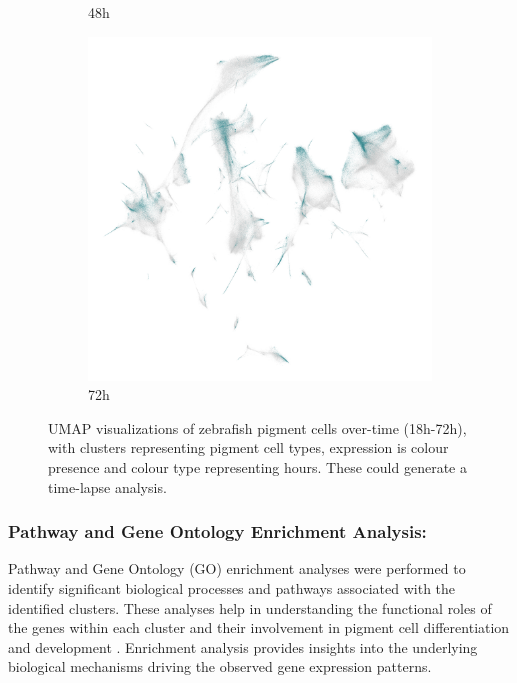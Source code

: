 \documentclass[runningheads]{llncs}
\begin{document}
\begin{figure}[H]
\begin{subfigure}[b]{0.3\textwidth}
    \caption{48h}
    \label{fig:umap_48h}
  \end{subfigure}
  \hfill
  \begin{subfigure}[b]{0.3\textwidth}
    \centering
    \includegraphics[height=0.18\textheight]{fig_umap_72h_optimized.png}
    \caption{72h}
    \label{fig:umap_72h}
  \end{subfigure}
  \caption{UMAP visualizations of zebrafish pigment cells over-time (18h-72h), with clusters representing pigment cell types, expression is colour presence and colour type representing hours. These could generate a time-lapse analysis.}
  \label{fig:umap_all}
\end{figure}

\subsubsection{Pathway and Gene Ontology Enrichment Analysis:} Pathway and Gene Ontology (GO) enrichment analyses were performed to identify significant biological processes and pathways associated with the identified clusters. These analyses help in understanding the functional roles of the genes within each cluster and their involvement in pigment cell differentiation and development \cite{kenny2022tfap2}. Enrichment analysis provides insights into the underlying biological mechanisms driving the observed gene expression patterns.
\end{document}
